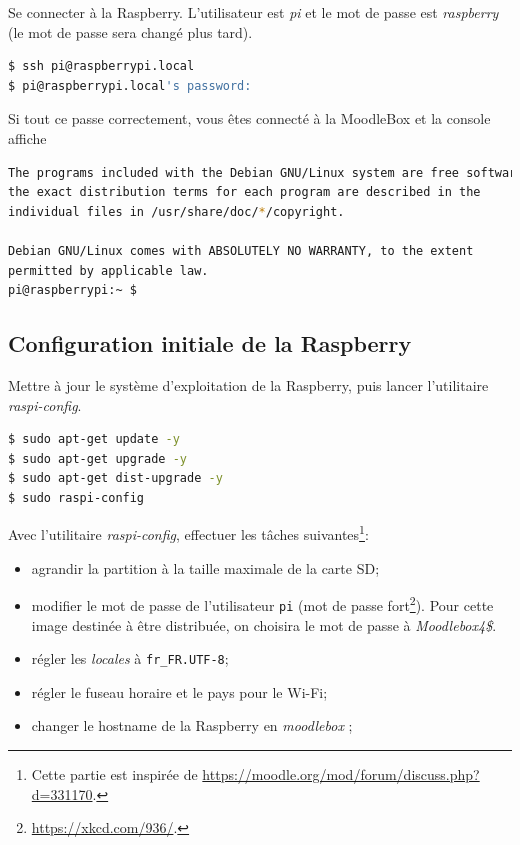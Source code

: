 \documentclass[11pt]{article}
\begin{document}
Se connecter à la Raspberry. L'utilisateur est \emph{pi} et le mot de passe est \emph{raspberry} (le mot de passe sera changé plus tard).

\begin{lstlisting}[language=bash]
$ ssh pi@raspberrypi.local
$ pi@raspberrypi.local's password: 
\end{lstlisting}

\begin{verification}
Si tout ce passe correctement, vous êtes connecté à la MoodleBox et la console affiche

\begin{lstlisting}[language=bash]
The programs included with the Debian GNU/Linux system are free software;
the exact distribution terms for each program are described in the
individual files in /usr/share/doc/*/copyright.

Debian GNU/Linux comes with ABSOLUTELY NO WARRANTY, to the extent
permitted by applicable law.
pi@raspberrypi:~ $
\end{lstlisting}
\end{verification}

\subsection{Configuration initiale de la Raspberry}

Mettre à jour le système d'exploitation de la Raspberry, puis lancer l'utilitaire \emph{raspi-config}.

\begin{lstlisting}[language=bash]
$ sudo apt-get update -y
$ sudo apt-get upgrade -y
$ sudo apt-get dist-upgrade -y
$ sudo raspi-config
\end{lstlisting}

Avec l'utilitaire \emph{raspi-config}, effectuer les tâches suivantes\footnote{Cette partie est inspirée de \url{https://moodle.org/mod/forum/discuss.php?d=331170}.}:
\begin{itemize}
\item agrandir la partition à la taille maximale de la carte SD;
\item modifier le mot de passe de l'utilisateur \lstinline{pi} (mot de passe fort\footnote{\url{https://xkcd.com/936/}.}). Pour cette image destinée à être distribuée, on choisira le mot de passe à \emph{Moodlebox4\$}.
\item régler les \emph{locales} à \lstinline{fr_FR.UTF-8};
\item régler le fuseau horaire et le pays pour le Wi-Fi;
\item changer le hostname de la Raspberry en \emph{moodlebox} ;
\end{itemize}
\end{document}
